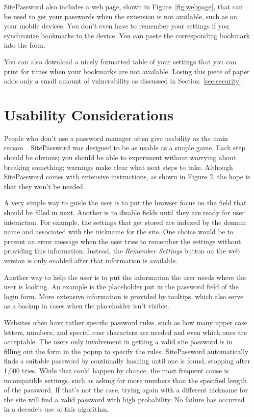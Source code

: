 SitePassword also includes a web page, shown in Figure~\ref{fig:webpage}, that can be used to get your passwords when the extension is not available, such as on your mobile devices.  You don't even have to remember your settings if you synchronize bookmarks to the device.  You can paste the corresponding bookmark into the form.  

You can also download a nicely formatted table of your settings that you can print for times when your bookmarks are not available.  Losing this piece of paper adds only a small amount of vulnerability as discussed in Section~\ref{sec:security}.

\section{Usability Considerations}\label{sec:usability}

People who don't use a password manager often give usability as the main reason~\cite{pearman}.  SitePassword was designed to be as usable as a simple game.  Each step should be obvious; you should be able to experiment without worrying about breaking something; warnings make clear what next steps to take.  Although SitePassword comes with extensive instructions, as shown in Figure 2, the hope is that they won't be needed.

A very simple way to guide the user is to put the browser focus on the field that should be filled in next. Another is to disable fields until they are ready for user interaction.  For example, the settings that get stored are indexed by the domain name and associated with the nickname for the site. One choice would be to present an error message when the user tries to remember the settings without providing this information.  Instead, the {\em Remember Settings} button on the web version is only enabled after that information is available.

Another way to help the user is to put the information the user needs where the user is looking.  An example is the placeholder put in the password field of the login form. More extensive information is provided by tooltips, which also serve as a backup in cases when the placeholder isn't visible.

Websites often have rather specific password rules, such as how many upper case letters, numbers, and special case characters are needed and even which ones are acceptable.  The users only involvement in getting a valid site password is in filling out the form in the popup to specify the rules.  SitePassword automatically finds a suitable password by continually hashing until one is found, stopping after 1,000 tries.  While that could happen by chance, the most frequent cause is incompatible settings, such as asking for more numbers than the specified length of the password.  If that's not the case, trying again with a different nickname for the site will find a valid password with high probability.  No failure has occurred in a decade's use of this algorithm.

